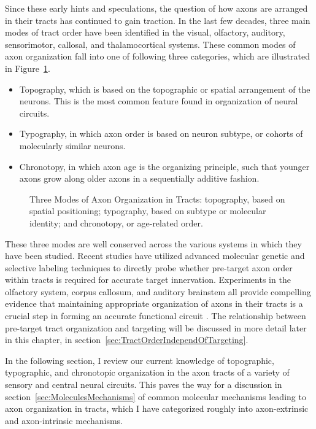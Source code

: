 Since these early hints and speculations, the question of how axons are arranged in their tracts has continued to gain traction. 
In the last few decades, three main modes of tract order have been identified in the visual, olfactory, auditory, sensorimotor, callosal, and thalamocortical systems.
These common modes of axon organization fall into one of following three categories, which are illustrated in Figure~\ref{AxonOrg_ThreeModes}.  
\begin{itemize}
\item Topography, which is based on the topographic or spatial arrangement of the neurons. This is the most common feature found in organization of neural circuits.
\item Typography, in which axon order is based on neuron subtype, or cohorts of molecularly similar neurons.
\item Chronotopy, in which axon age is the organizing principle, such that younger axons grow along older axons in a sequentially additive fashion. 
\end{itemize}
\begin{figure}[hbtp]
	\makebox[\textwidth]{\framebox[5cm]{\rule{0pt}{5cm}}}
	\caption[Three Modes of Axon Organization in Tracts]{Three Modes of Axon Organization in Tracts: topography, based on spatial positioning; typography, based on subtype or molecular identity; and chronotopy, or age-related order. \label{AxonOrg_ThreeModes}}
\end{figure}
These three modes are well conserved across the various systems in which they have been studied.
Recent studies have utilized advanced molecular genetic and selective labeling techniques to directly probe whether pre-target axon order within tracts is required for accurate target innervation.
Experiments in the olfactory system, corpus callosum, and auditory brainstem all provide compelling evidence that maintaining appropriate organization of axons in their tracts is a crucial step in forming an accurate functional circuit \cite{imai2009pre,zhou2013axon,michalski2013robo3}.
The relationship between pre-target tract organization and targeting will be discussed in more detail later in this chapter, in section~\ref{sec:TractOrderIndependOfTargeting}.

In the following section, I review our current knowledge of topographic, typographic, and chronotopic organization in the axon tracts of a variety of sensory and central neural circuits.
This paves the way for a discussion in section~\ref{sec:MoleculesMechanisms} of common molecular mechanisms leading to axon organization in tracts, which I have categorized roughly into axon-extrinsic and axon-intrinsic mechanisms.